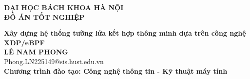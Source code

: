 \documentclass[DoAn.tex]{subfiles}
\begin{document}
\begin{titlepage}
\thispagestyle{empty}
\begin{center}

{\textbf{\large{ĐẠI HỌC BÁCH KHOA HÀ NỘI}}}\\[4cm]

{\textbf{\huge{ ĐỒ ÁN TỐT NGHIỆP}}}\\[1cm]
{\textbf{\Large{Xây dựng hệ thống tường lửa kết hợp thông minh dựa trên công nghệ XDP/eBPF}}\\[1cm]

{\textbf{\large{LÊ NAM PHONG}}}\\
{\large{Phong.LN225149@sis.hust.edu.vn}}\\[0.5cm]

{\textbf{\large{Chương trình đào tạo: Công nghệ thông tin - Kỹ thuật máy tính
}}}\\

\vspace{4cm}
\begin{table}[H]
\centering
{}
\end{table}}
\end{center}



\end{titlepage}
\end{document}
